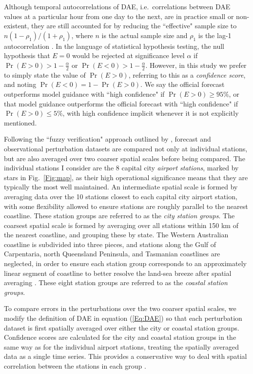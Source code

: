 \documentclass[twocol]{ametsoc}
\DeclareMathOperator{\pr}{Pr}
\begin{document}
Although temporal autocorrelations of DAE, i.e.~correlations between DAE values at a particular hour from one day to the next, are in practice small or non-existent, they are still accounted for by reducing the ``effective" sample size to $ n \left(1-\rho_1\right)/\left(1+\rho_1\right)$, where $n$ is the actual sample size and $\rho_1$ is the lag-1 autocorrelation \citep{zwiers95,wilks11}. In the language of statistical hypothesis testing, the null hypothesis that $E=0$ would be rejected at significance level $\alpha$ if $\pr(E>0) > 1-\frac{\alpha}{2}$ or $\pr(E<0) > 1-\frac{\alpha}{2}$. However, in this study we prefer to simply state the value of $\pr(E>0)$, referring to this as a \textit{confidence score}, and noting $\pr(E<0) = 1- \pr(E>0)$. We say the official forecast outperforms model guidance with ``high confidence" if $\pr(E>0) \geq 95\%$, or that model guidance outperforms the  official forecast with ``high confidence" if $\pr(E>0) \leq 5\%$, with high confidence implicit whenever it is not explicitly mentioned.

Following the ``fuzzy verification" approach outlined by \citet{ebert08}, forecast and observational perturbation datasets are compared not only at individual stations, but are also averaged over two coarser spatial scales before being compared. The individual stations I consider are the 8 capital city \textit{airport stations}, marked by stars in Fig.~\ref{Fig:map}, as their high operational significance means that they are typically the most well maintained. An intermediate spatial scale is formed by averaging data over the 10 stations closest to each capital city airport station, with some flexibility allowed to ensure stations are roughly parallel to the nearest coastline. These station groups are referred to as the \textit{city station groups}. The coarsest spatial scale is formed by averaging over all stations within 150 km of the nearest coastline, and grouping these by state. The Western Australian coastline is subdivided into three pieces, and stations along the Gulf of Carpentaria, north Queensland Peninsula, and Tasmanian coastlines are neglected, in order to ensure each station group corresponds to an approximately linear segment of coastline to better resolve the land-sea breeze after spatial averaging \citep[e.g.][]{vincent16}. These eight station groups are referred to as the \textit{coastal station groups}.

To compare errors in the perturbations over the two coarser spatial scales, we modify the definition of DAE in equation (\ref{Eq:DAE}) so that each perturbation dataset is first spatially averaged over either the city or coastal station groups. Confidence scores are calculated for the city and coastal station groups in the same way as for the individual airport stations, treating the spatially averaged data as a single time series. This provides a conservative way to deal with spatial correlation between the stations in each group \citep{griffiths17}. 
\end{document}
